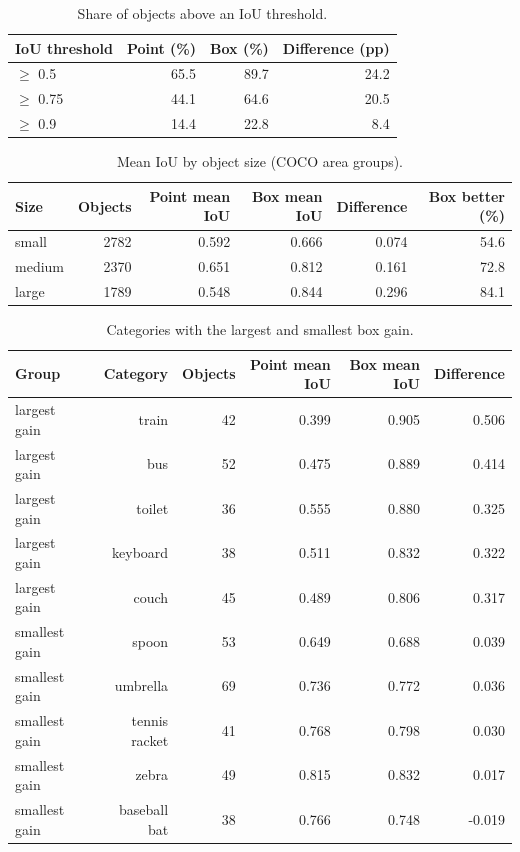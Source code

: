 \begin{table}[t]
\centering
\caption{Share of objects above an IoU threshold.}
\small
\begin{tabular}{lrrr}
\toprule
IoU threshold & Point (\%) & Box (\%) & Difference (pp) \\
\midrule
$\geq$ 0.5 & 65.5 & 89.7 & 24.2 \\
$\geq$ 0.75 & 44.1 & 64.6 & 20.5 \\
$\geq$ 0.9 & 14.4 & 22.8 & 8.4 \\
\bottomrule
\end{tabular}
\end{table}

\begin{table}[t]
\centering
\caption{Mean IoU by object size (COCO area groups).}
\small
\begin{tabular}{lrrrrr}
\toprule
Size & Objects & Point mean IoU & Box mean IoU & Difference & Box better (\%) \\
\midrule
small & 2782 & 0.592 & 0.666 & 0.074 & 54.6 \\
medium & 2370 & 0.651 & 0.812 & 0.161 & 72.8 \\
large & 1789 & 0.548 & 0.844 & 0.296 & 84.1 \\
\bottomrule
\end{tabular}
\end{table}

\begin{table}[t]
\centering
\caption{Categories with the largest and smallest box gain.}
\small
\begin{tabular}{lrrrrr}
\toprule
Group & Category & Objects & Point mean IoU & Box mean IoU & Difference \\
\midrule
largest gain & train & 42 & 0.399 & 0.905 & 0.506 \\
largest gain & bus & 52 & 0.475 & 0.889 & 0.414 \\
largest gain & toilet & 36 & 0.555 & 0.880 & 0.325 \\
largest gain & keyboard & 38 & 0.511 & 0.832 & 0.322 \\
largest gain & couch & 45 & 0.489 & 0.806 & 0.317 \\
smallest gain & spoon & 53 & 0.649 & 0.688 & 0.039 \\
smallest gain & umbrella & 69 & 0.736 & 0.772 & 0.036 \\
smallest gain & tennis racket & 41 & 0.768 & 0.798 & 0.030 \\
smallest gain & zebra & 49 & 0.815 & 0.832 & 0.017 \\
smallest gain & baseball bat & 38 & 0.766 & 0.748 & -0.019 \\
\bottomrule
\end{tabular}
\end{table}
